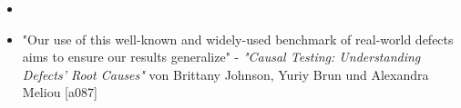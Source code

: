 \begin{itemize}
    \item %
    \item  "Our use of this well-known and widely-used benchmark of real-world defects aims to ensure our results generalize" - \textit{"Causal Testing: Understanding Defects’ Root Causes"} von Brittany Johnson, Yuriy Brun und Alexandra Meliou [a087]
\end{itemize}
